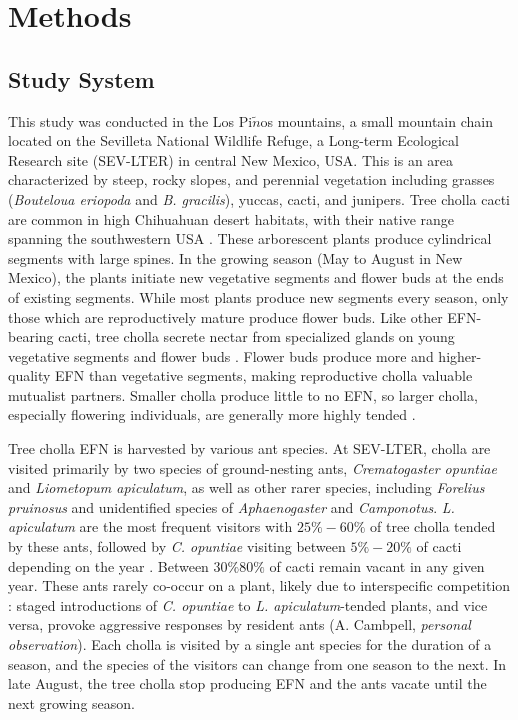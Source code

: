 \documentclass[11pt]{article}
\begin{document}
	
	\section*{Methods}
	\subsection*{Study System}
	
	This study was conducted in the Los Pi$\tilde{n}$os mountains, a small mountain chain located on the Sevilleta National Wildlife Refuge, a Long-term Ecological Research site (SEV-LTER) in central New Mexico, USA.
	This is an area characterized by steep, rocky slopes, and perennial vegetation including grasses (\textit{Bouteloua eriopoda} and \textit{B. gracilis}), yuccas, cacti, and junipers. 
	Tree cholla cacti are common in high Chihuahuan desert habitats, with their native range spanning the southwestern USA \citep{Benson1982}. 
	These arborescent plants produce cylindrical segments with large spines. 
	In the growing season (May to August in New Mexico), the plants initiate new vegetative segments and flower buds at the ends of existing segments. 
	While most plants produce new segments every season, only those which are reproductively mature produce flower buds. 
	Like other EFN-bearing cacti, tree cholla secrete nectar from specialized glands on young vegetative segments and flower buds \citep{Ness2006,Oliveira1999}. 
	Flower buds produce more and higher-quality EFN than vegetative segments, making reproductive cholla valuable mutualist partners. 
	Smaller cholla produce little to no EFN, so larger cholla, especially flowering individuals, are generally more highly tended \citep{Miller2014}. 
	
	Tree cholla EFN is harvested by various ant species. 
	At SEV-LTER, cholla are visited primarily by two species of ground-nesting ants, \textit{Crematogaster opuntiae} and \textit{Liometopum apiculatum}, as well as other rarer species, including \textit{Forelius pruinosus} and unidentified species of \textit{Aphaenogaster} and \textit{Camponotus}.
	\textit{L. apiculatum} are the most frequent visitors with $25\% - 60\%$ of tree cholla tended by these ants, followed by \textit{C. opuntiae} visiting between $5\% - 20\%$ of cacti depending on the year \citep{Donald2022}. 
	Between $ 30\% 80\%$ of cacti remain vacant in any given year. 
	These ants rarely co-occur on a plant, likely due to interspecific competition \citep{Miller2007}: staged introductions of \textit{C. opuntiae} to \textit{L. apiculatum}-tended plants, and vice versa, provoke aggressive responses by resident ants (A. Cambpell, \textit{personal observation}).
	Each cholla is visited by a single ant species for the duration of a season, and the species of the visitors can change from one season to the next. 
	In late August, the tree cholla stop producing EFN and the ants vacate until the next growing season. 
	
\end{document}
